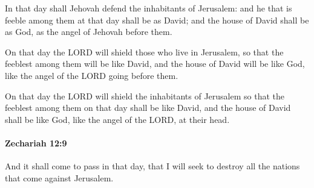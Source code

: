 			\begin{versebox}
					\item[BHS] 
					\item[LXX] 
					\item[ASV] In that day shall Jehovah defend the inhabitants of Jerusalem: and he that is feeble among them at that day shall be as David; and the house of David shall be as God, as the angel of Jehovah before them.
					\item[NIV] On that day the LORD will shield those who live in Jerusalem, so that the feeblest among them will be like David, and the house of David will be like God, like the angel of the LORD going before them.
					\item[NRSV] On that day the LORD will shield the inhabitants of Jerusalem so that the feeblest among them on that day shall be like David, and the house of David shall be like God, like the angel of the LORD, at their head.
			\end{versebox}

		\paragraph{Zechariah 12:9} %
			\label{ZECHARIAH-12-9}

			And it shall come to pass in that day, that I will seek to destroy all the nations that come against Jerusalem.


